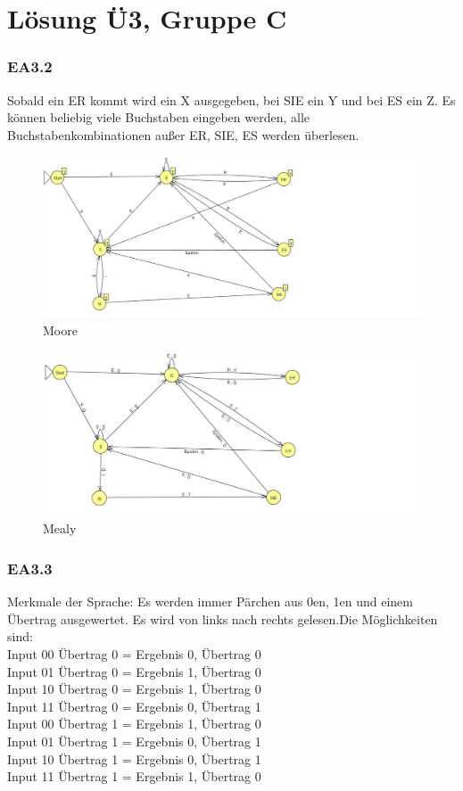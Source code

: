 \documentclass[12pt,twoside,a4paper]{article}
\author{Thorben Schomacker}
\author{Ferdinand Trendelenburg}
\begin{document}
\part*{Lösung Ü3, Gruppe C}

\section{EA3.2}

Sobald ein ER kommt wird ein X ausgegeben, bei SIE ein Y und bei ES ein Z. 
Es können beliebig viele Buchstaben eingeben werden, alle Buchstabenkombinationen außer ER, SIE, ES werden überlesen.

\begin{figure}[!htb]
\centering
\includegraphics[width=180mm]{32moore.jpg}
\caption{Moore \label{overflow}}
\end{figure}

\begin{figure}[!htb]
\centering
\includegraphics[width=180mm]{32mealy.jpg}
\caption{Mealy \label{overflow}}
\end{figure}

\newpage 
\section{EA3.3}

Merkmale der Sprache: Es werden immer Pärchen aus 0en, 1en und einem Übertrag ausgewertet. Es wird von links nach rechts gelesen.Die Möglichkeiten sind: \\
Input 00 Übertrag 0 = Ergebnis 0, Übertrag 0 \\
Input 01 Übertrag 0 = Ergebnis 1, Übertrag 0 \\
Input 10 Übertrag 0 = Ergebnis 1, Übertrag 0 \\
Input 11 Übertrag 0 = Ergebnis 0, Übertrag 1 \\

Input 00 Übertrag 1 = Ergebnis 1, Übertrag 0 \\
Input 01 Übertrag 1 = Ergebnis 0, Übertrag 1 \\
Input 10 Übertrag 1 = Ergebnis 0, Übertrag 1 \\
Input 11 Übertrag 1 = Ergebnis 1, Übertrag 0 \\
\end{document}

